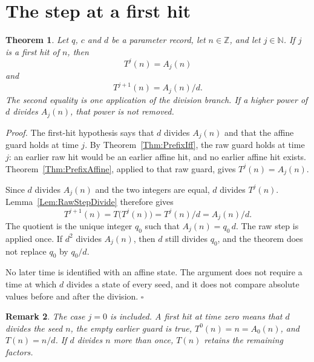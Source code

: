 \documentclass[11pt,letterpaper]{article}
\newcommand{\N}{\mathbb{N}}
\newcommand{\Z}{\mathbb{Z}}
\newtheorem{theorem}{Theorem}
\newtheorem{remark}[theorem]{Remark}
\newenvironment{proof}{\noindent\textit{Proof.}}{\hfill\(\square\)}
\begin{document}
\section{The step at a first hit}

\begin{theorem}\label{Thm:FirstHitStep}
Let \(q\), \(c\) and \(d\) be a parameter record, let \(n\in\Z\), and let \(j\in\N\). If \(j\) is a first hit of \(n\), then
\[
T^{j}(n)=A_{j}(n)
\]
and
\[
T^{j+1}(n)=A_{j}(n)/d.
\]
The second equality is one application of the division branch. If a higher power of \(d\) divides \(A_{j}(n)\), that power is not removed.
\end{theorem}

\begin{proof}
The first-hit hypothesis says that \(d\) divides \(A_{j}(n)\) and that the affine guard holds at time \(j\). By Theorem~\ref{Thm:PrefixIff}, the raw guard holds at time \(j\): an earlier raw hit would be an earlier affine hit, and no earlier affine hit exists. Theorem~\ref{Thm:PrefixAffine}, applied to that raw guard, gives \(T^{j}(n)=A_{j}(n)\).

Since \(d\) divides \(A_{j}(n)\) and the two integers are equal, \(d\) divides \(T^{j}(n)\). Lemma~\ref{Lem:RawStepDivide} therefore gives
\[
T^{j+1}(n)=T\bigl(T^{j}(n)\bigr)=T^{j}(n)/d=A_{j}(n)/d.
\]
The quotient is the unique integer \(q_{0}\) such that \(A_{j}(n)=q_{0}\,d\). The raw step is applied once. If \(d^{2}\) divides \(A_{j}(n)\), then \(d\) still divides \(q_{0}\), and the theorem does not replace \(q_{0}\) by \(q_{0}/d\).

No later time is identified with an affine state. The argument does not require a time at which \(d\) divides a state of every seed, and it does not compare absolute values before and after the division.
\end{proof}

\begin{remark}
The case \(j=0\) is included. A first hit at time zero means that \(d\) divides the seed \(n\), the empty earlier guard is true, \(T^{0}(n)=n=A_{0}(n)\), and \(T(n)=n/d\). If \(d\) divides \(n\) more than once, \(T(n)\) retains the remaining factors.
\end{remark}
\end{document}
